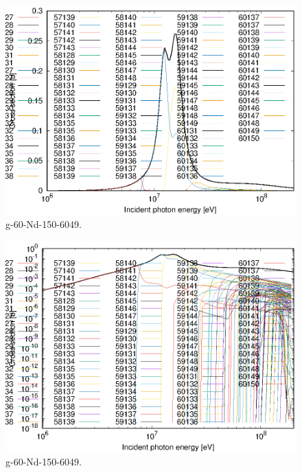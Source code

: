 \begin{figure}
 \includegraphics[width=\linewidth]{eps/g_60-Nd-150_6049.eps}
  \caption{g-60-Nd-150-6049.}
\end{figure}
\begin{figure}
 \includegraphics[width=\linewidth]{eps-log/g_60-Nd-150_6049.eps}
 \caption{g-60-Nd-150-6049.}
\end{figure}
\newpage \clearpage

